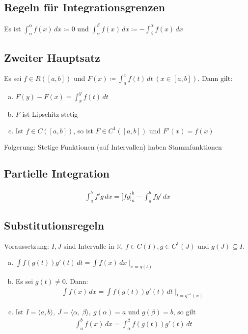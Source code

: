 \subsection{Regeln für Integrationsgrenzen}
Es ist $\int_\alpha^\alpha f(x)\,dx \coloneqq 0$ und $\int_\alpha^\beta f(x)\,dx \coloneqq -\int_\beta^\alpha f(x)\,dx$

\subsection{Zweiter Hauptsatz}
Es sei $f \in R([a,b])$ und $F(x) \coloneqq \int_a^x f(t)\,dt\ (x \in [a,b])$. Dann gilt:
\begin{enumerate}[a)]
    \item $F(y) - F(x) = \int_x^y f(t)\,dt$
    \item $F$ ist Lipschitz-stetig
    \item Ist $f \in C([a,b])$, so ist $F \in C^1([a,b])$ und $F'(x) = f(x)$
\end{enumerate}
Folgerung: Stetige Funktionen (auf Intervallen) haben Stammfunktionen

\subsection{Partielle Integration}
\begin{align*}
    \int_a^b f'g\,dx = \Big[fg \Big]_{a}^b - \int_a^b fg'\,dx
\end{align*}

\subsection{Substitutionsregeln}
Voraussetzung: $I,J$ sind Intervalle in $\mathbb{R}$, $f \in C(I), g \in C^1(J)$ und $g(J) \subseteq I$.
\begin{enumerate}[a)]
    \item $\int f(g(t)) g'(t)\,dt = \int f(x)\,dx \mid_{x=g(t)}$
    \item Es sei $g(t) \neq 0$. Dann:
    \begin{align*}
        \int f(x)\,dx = \int f(g(t)) g'(t)\,dt \mid_{t=g^{-1}(x)}
    \end{align*}
    \item Ist $I = \langle a,b \rangle,\ J = \langle \alpha,\ \beta \rangle,\ g(\alpha) = a \text{ und } g(\beta)=b$, so gilt
    \begin{align*}
        \int_a^b f(x)\,dx = \int_\alpha^\beta f(g(t))g'(t)\,dt
    \end{align*}
\end{enumerate}

